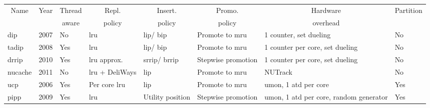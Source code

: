 \begin{table}[thb]
\begin{tabular}{|p{1.4cm}|p{0.5cm}|p{0.8cm}|p{1.2cm}|p{1.2cm}|p{1.4cm}|p{1.2cm}|p{1.0cm}|}
\hline
\multicolumn{1}{|c|}{Name} & \multicolumn{1}{c|}{Year} & \multicolumn{1}{c|}{Thread} & \multicolumn{1}{c|}{Repl.} & \multicolumn{1}{c|}{Insert.} & \multicolumn{1}{c|}{Promo.} & \multicolumn{1}{c|}{Hardware}    & \multicolumn{1}{c|}{Partition}     \\
\multicolumn{1}{|c|}{}          & \multicolumn{1}{c|}{}          & \multicolumn{1}{c|}{aware}  & \multicolumn{1}{c|}{policy}      & \multicolumn{1}{c|}{policy}    & \multicolumn{1}{c|}{policy}    & \multicolumn{1}{c|}{overhead\footnotemark}  & \multicolumn{1}{c|}{}       \\ \hline
\gls{dip}                             & 2007                           & No                          & \gls{lru}                              & \gls{lip}/ \gls{bip}                        & Promote to \gls{mru}            & 1 counter, set dueling    & No            \\ \hline
\gls{tadip}                           & 2008                          & Yes                         & \gls{lru}                              & \gls{lip}/ \gls{bip}                        & Promote to \gls{mru}            & 1 counter per core, set dueling  & No          \\ \hline
\gls{drrip}                           & 2010                          & Yes                         & \gls{lru} approx.                      & \gls{srrip}/ \gls{brrip}                    & Stepwise promotion            & 1 counter per core, set dueling  & No          \\ \hline
\gls{nucache}                         & 2011                         & No                          & \gls{lru} + DeliWays     & \gls{lip}                            & Promote to \gls{mru}                 & NUTrack                            & No    \\ \hline
\gls{ucp}                             & 2006                           & Yes                         & Per core \gls{lru}                     & \gls{lip}                            & Promote to \gls{mru}                 & \gls{umon}, 1 \gls{atd} per core   & Yes                \\ \hline
\gls{pipp}                            & 2009                           & Yes                         & \gls{lru}                              & Utility position               & Stepwise promotion            & \gls{umon}, 1 \gls{atd} per core, random generator & Yes \\ \hline

\end{tabular}
\end{table}
